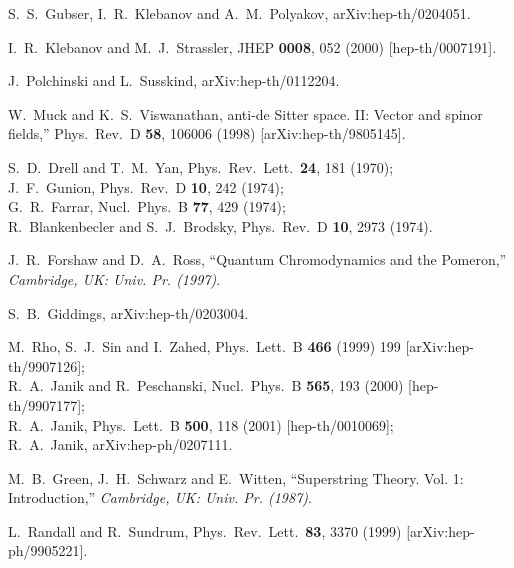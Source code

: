 \begin{thebibliography}{}
S.~S.~Gubser, I.~R.~Klebanov and A.~M.~Polyakov,
arXiv:hep-th/0204051.

I.~R.~Klebanov and M.~J.~Strassler,
JHEP {\bf 0008}, 052 (2000)
[hep-th/0007191].

J.~Polchinski and L.~Susskind,
arXiv:hep-th/0112204.

W.~Muck and K.~S.~Viswanathan,
anti-de Sitter space. II: Vector and spinor fields,''
Phys.\ Rev.\ D {\bf 58}, 106006 (1998)
[arXiv:hep-th/9805145].

S.~D.~Drell and T.~M.~Yan,
Phys.\ Rev.\ Lett.\  {\bf 24}, 181 (1970);\\
J.~F.~Gunion,
Phys.\ Rev.\ D {\bf 10}, 242 (1974);\\
G.~R.~Farrar,
Nucl.\ Phys.\ B {\bf 77}, 429 (1974);\\
R.~Blankenbecler and S.~J.~Brodsky,
Phys.\ Rev.\ D {\bf 10}, 2973 (1974).



J.~R.~Forshaw and D.~A.~Ross,
``Quantum Chromodynamics and the Pomeron,''
{\it  Cambridge, UK: Univ. Pr. (1997)}.


S.~B.~Giddings,
arXiv:hep-th/0203004.


M.~Rho, S.~J.~Sin and I.~Zahed,
Phys.\ Lett.\ B {\bf 466} (1999) 199
[arXiv:hep-th/9907126];\\
R.~A.~Janik and R.~Peschanski,
Nucl.\ Phys.\ B {\bf 565}, 193 (2000)
[hep-th/9907177];\\
R.~A.~Janik,
Phys.\ Lett.\ B {\bf 500}, 118 (2001)
[hep-th/0010069];\\
R.~A.~Janik,
arXiv:hep-ph/0207111.

M.~B.~Green, J.~H.~Schwarz and E.~Witten,
``Superstring Theory. Vol. 1: Introduction,''
{\it  Cambridge, UK: Univ. Pr. (1987)}.


L.~Randall and R.~Sundrum,
Phys.\ Rev.\ Lett.\  {\bf 83}, 3370 (1999)
[arXiv:hep-ph/9905221].



\end{thebibliography}
